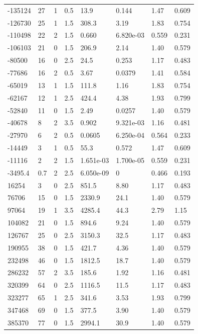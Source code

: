 \documentclass[preview]{standalone}
\begin{document}
{{\begin{tabular}{L{1.2cm}C{1.2cm} C{0.3cm}C{0.5cm} C{1.4cm}C{1.4cm} C{1.4cm}C{1.4cm}}
  -135124  &    27  & 1     & 0.5 &  13.9  & 0.144  & 1.47 &  0.609   \\ 
  -126730  &    25  & 1     & 1.5 &  308.3  & 3.19  & 1.83 &  0.754   \\ 
  -110498  &    22  & 2     & 1.5 &  0.660  & 6.820e-03  & 0.559 &  0.231   \\ 
  -106103  &    21  & 0     & 1.5 &  206.9  & 2.14  & 1.40 &  0.579   \\ 
  -80500  &    16  & 0     & 2.5 &  24.5  & 0.253  & 1.17 &  0.483   \\ 
  -77686  &    16  & 2     & 0.5 &  3.67  & 0.0379  & 1.41 &  0.584   \\ 
  -65019  &    13  & 1     & 1.5 &  111.8  & 1.16  & 1.83 &  0.754   \\ 
  -62167  &    12  & 1     & 2.5 &  424.4  & 4.38  & 1.93 &  0.799   \\ 
  -52840  &    11  & 0     & 1.5 &  2.49  & 0.0257  & 1.40 &  0.579   \\ 
  -40678  &     8  & 2     & 3.5 &  0.902  & 9.321e-03  & 1.16 &  0.481   \\ 
  -27970  &     6  & 2     & 0.5 &  0.0605  & 6.250e-04  & 0.564 &  0.233   \\ 
  -14449  &     3  & 1     & 0.5 &  55.3  & 0.572  & 1.47 &  0.609   \\ 
  -11116  &     2  & 2     & 1.5 &  1.651e-03  & 1.700e-05  & 0.559 &  0.231   \\ 
  -3495.4  &   0.7  & 2     & 2.5 &  6.050e-09  & 0  & 0.466 &  0.193   \\ 
  16254  &     3  & 0     & 2.5 &  851.5  & 8.80  & 1.17 &  0.483   \\ 
  76706  &    15  & 0     & 1.5 &  2330.9  & 24.1  & 1.40 &  0.579   \\ 
  97064  &    19  & 1     & 3.5 &  4285.4  & 44.3  & 2.79 &  1.15   \\ 
  104082  &    21  & 0     & 1.5 &  894.6  & 9.24  & 1.40 &  0.579   \\ 
  126767  &    25  & 0     & 2.5 &  3150.3  & 32.5  & 1.17 &  0.483   \\ 
  190955  &    38  & 0     & 1.5 &  421.7  & 4.36  & 1.40 &  0.579   \\ 
  232498  &    46  & 0     & 1.5 &  1812.5  & 18.7  & 1.40 &  0.579   \\ 
  286232  &    57  & 2     & 3.5 &  185.6  & 1.92  & 1.16 &  0.481   \\ 
  320399  &    64  & 0     & 2.5 &  1116.5  & 11.5  & 1.17 &  0.483   \\ 
  323277  &    65  & 1     & 2.5 &  341.6  & 3.53  & 1.93 &  0.799   \\ 
  347468  &    69  & 0     & 1.5 &  377.5  & 3.90  & 1.40 &  0.579   \\ 
  385370  &    77  & 0     & 1.5 &  2994.1  & 30.9  & 1.40 &  0.579   \\ 
\hline 
\end{tabular} 

}}
\end{document}
